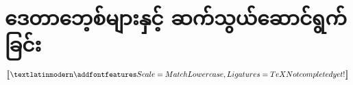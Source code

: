 \chapter{ဒေတာဘေ့စ်များနှင့် ဆက်သွယ်ဆောင်ရွက်ခြင်း}
$\big\llbracket \fEn{Not completed yet!} \big\rrbracket$